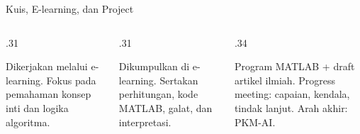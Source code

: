 \documentclass[aspectratio=169,10pt]{beamer}
\begin{document}
\begin{frame}{Kuis, E-learning, dan Project}
\scriptsize
\begin{columns}[T,totalwidth=\textwidth]
\begin{column}{.31\textwidth}
\begin{bluebox}[Kuis]
Dikerjakan melalui e-learning. Fokus pada pemahaman konsep inti dan logika algoritma.
\end{bluebox}
\end{column}
\begin{column}{.31\textwidth}
\begin{orangebox}[Tugas]
Dikumpulkan di e-learning. Sertakan perhitungan, kode MATLAB, galat, dan interpretasi.
\end{orangebox}
\end{column}
\begin{column}{.34\textwidth}
\begin{greenbox}
Program MATLAB + draft artikel ilmiah. Progress meeting: capaian, kendala, tindak lanjut. Arah akhir: PKM-AI.
\end{greenbox}
\end{column}
\end{columns}
\end{frame}
\end{document}
